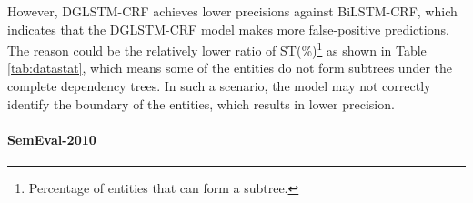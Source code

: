 However, DGLSTM-CRF achieves lower precisions against BiLSTM-CRF, which indicates that the DGLSTM-CRF model makes more false-positive predictions. 
The reason could be the relatively lower ratio of ST(\%)\footnote{Percentage of entities that can form a subtree.} as shown in Table \ref{tab:datastat}, which means some of the entities do not form subtrees under the complete dependency trees. 
In such a scenario, the model may not correctly identify the boundary of the entities, which results in lower precision. 









\paragraph{SemEval-2010} 


